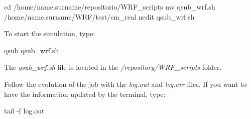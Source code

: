 \begin{bashcode}
cd /home/name.surname/repositorio/WRF_scripts
mv qsub_wrf.sh /home/name.surname/WRF/test/em_real
nedit qsub_wrf.sh
\end{bashcode}
\bigskip

\noindent To start the simulation, type:
\bigskip

\begin{bashcode}
qsub qsub_wrf.sh
\end{bashcode}
\bigskip

\begin{tcolorbox}[enhanced,
  grow to left by=0cm,%
  grow to right by=0cm,%
  enlarge top by=0cm,%
  enlarge bottom by=0cm,%
  tcbox raise base,
  boxrule=1.0pt,
  left=18mm,
  colframe=red!50!black,coltext=red!25!black,colback=red!10!white,
  overlay={\begin{tcbclipinterior}\fill[red!75!blue!50!white] (frame.south west)
    rectangle node[text=white,font=\sffamily\bfseries\footnotesize,rotate=0] {WARNING} ([xshift=18mm]frame.north west);\end{tcbclipinterior}}]
The \textit{qsub\_wrf.sh} file is located in the \textit{/repository/WRF\_scripts} folder.
\end{tcolorbox}
\bigskip

\noindent Follow the evolution of the job with the \textit{log.out} and \textit {log.err} files. If you want to have the information 
updated by the terminal, type:
\bigskip

\begin{bashcode}
tail -f log.out
\end{bashcode}
\bigskip
